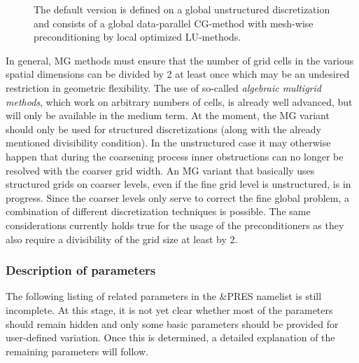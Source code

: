 \begin{figure}[ht]
\centering
\caption{The default \uscarc{} version is defined on a global unstructured discretization and consists of a global data-parallel CG-method with mesh-wise preconditioning by local optimized LU-methods.} 
\label{FIG_default_uscarc}
\end{figure}
 
In general, MG methods must ensure that the number of grid cells in the various spatial dimensions can be divided by 2 at least once which may be an undesired restriction in geometric flexibility.
 The use of so-called {\it algebraic multigrid methods}, which work on arbitrary numbers of cells, is already well advanced, but will only be available in the medium term.
At the moment, the MG variant should only be used for structured discretizations (along with the already mentioned divisibility condition). In the unstructured case it may otherwise happen that during the coarsening process inner obstructions can no longer be resolved with the coarser grid width. 
An MG variant that basically uses structured grids on coarser levels, even if the fine grid level is unstructured, is in progress. Since the coarser levels only serve to correct the fine global problem, a combination of different discretization techniques is possible.
The same considerations currently holds true for the usage of the \tls{} preconditioners as they also require a divisibility of the grid size at least by 2.

\subsubsection{Description of parameters}

The following listing of \scarc{} related parameters in the {\ct \&PRES} namelist is still incomplete.
At this stage, it is not yet clear whether most of the \scarc{} parameters should remain hidden and only some basic parameters should be provided for user-defined variation. Once this is determined, a detailed explanation of the remaining parameters will follow.

